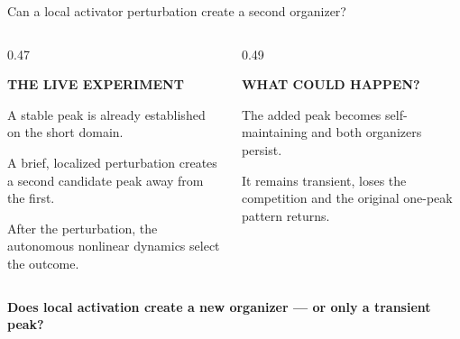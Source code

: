 

\begin{frame}{Can a local activator perturbation create a second organizer?}

  \vspace{-0.18cm}

  \begin{columns}[c,onlytextwidth]
    \begin{column}{0.47\textwidth}
      {\color{HydraGold}\bfseries\fontsize{7.7}{9.2}\selectfont
        THE LIVE EXPERIMENT\par}

      \vspace{0.16cm}

        {A stable peak is already established on the short domain.}

      \vspace{-0.12cm}

        {A brief, localized perturbation creates a second candidate peak away from the first.}

      \vspace{-0.12cm}

        {After the perturbation, the autonomous nonlinear dynamics select the outcome.}
    \end{column}

    \begin{column}{0.49\textwidth}
      {\color{HydraMuted}\bfseries\fontsize{7.7}{9.2}\selectfont
        WHAT COULD HAPPEN?\par}

      \vspace{0.16cm}

        {The added peak becomes self-maintaining and both organizers persist.}

      \vspace{-0.12cm}

        {It remains transient, loses the competition and the original one-peak pattern returns.}
    \end{column}
  \end{columns}

  \vspace{0.22cm}

  \begin{center}
    {\color{HydraWhite}\bfseries\fontsize{12.5}{15.3}\selectfont
      Does local activation create a new organizer --- or only a transient peak?
    \par}
  \end{center}
\end{frame}


